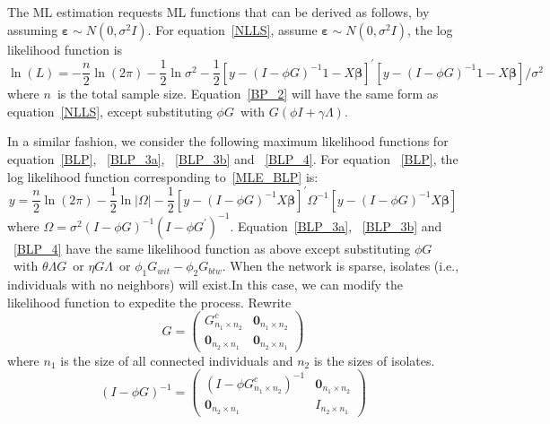 \documentclass[nojss]{jss}
\begin{document}
The ML estimation requests ML functions that can be derived as follows, by assuming $\mathbf{\varepsilon}\sim N(0,\sigma ^{2}I).$ For equation~\ref{NLLS}, assume $\mathbf{\varepsilon }\sim N(0,\sigma ^{2}I)$, the log likelihood function is
\begin{equation}
\ln \left( L\right) =-\frac{n}{2}\ln \left( 2\pi \right) -\frac{1}{2}\ln
\sigma ^{2}-\frac{1}{2}\left[y-(I-\phi G)^{-1}1-X\mathbf{\beta }%
\right] ^{\prime }\left[ y-(I-\phi G)^{-1}1-X\mathbf{\beta }\right]
/\sigma ^{2}
\end{equation}
where $n$\ is the total sample size. Equation~\ref{BP_2} will have the same form as equation~\ref{NLLS}, except substituting $\phi G$\ with $G(\phi I+\gamma \Lambda)$.

In a similar fashion, we consider the following maximum likelihood functions for equation~\ref{BLP}, ~\ref{BLP_3a}, ~\ref{BLP_3b} and ~\ref{BLP_4}.
For equation ~\ref{BLP}, the log likelihood function corresponding to~\ref{MLE_BLP} is:
\begin{equation}
y=\frac{n}{2}\ln \left( 2\pi \right) -\frac{1}{2}\ln |\Omega |-\frac{1}{2}%
\left[ y-(I-\phi G)^{-1}X\mathbf{\beta }\right] ^{\prime }\Omega ^{-1}\left[
y-(I-\phi G)^{-1}X\mathbf{\beta }\right]  
\label{MLE_BLP}
\end{equation}
where $\Omega =\sigma ^{2}(I-\phi G)^{-1}(I-\phi G^{\prime })^{-1}$. Equation~\ref{BLP_3a}, ~\ref{BLP_3b} and ~\ref{BLP_4} have the same likelihood function as above except substituting $\phi G$\ with $\theta \Lambda G$\ or $\eta G\Lambda $\ or $\phi _{1}G_{wit}-\phi _{2}G_{btw}$.
When the network is sparse, isolates (i.e., individuals with no neighbors) will exist.In this case, we can modify the
likelihood function to expedite the process. Rewrite
\begin{equation}
G=\left( 
\begin{array}{cc}
G_{n_{1}\times n_{2}}^{c} & \mathbf{0}_{n_{1}\times n_{2}} \\ 
\mathbf{0}_{n_{2}\times n_{1}} & \mathbf{0}_{n_{2}\times n_{1}}%
\end{array}\right)
\end{equation}
where $n_{1}$ is the size of all connected individuals and $n_{2}$ is the sizes of isolates.
\begin{equation}
\left( I-\phi G\right) ^{-1}=\left( 
\begin{array}{cc}
\left(I-\phi G_{n_{1}\times n_{2}}^{c}\right) ^{-1} & \mathbf{0}_{n_{1}\times n_{2}}
\\
\mathbf{0}_{n_{2}\times n_{1}} & I_{n_{2}\times n_{1}}
\end{array}\right)
\end{equation}
\end{document}
